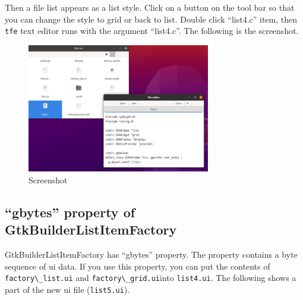 Then a file list appears as a list style. Click on a button on the tool
bar so that you can change the style to grid or back to list. Double
click ``list4.c'' item, then \passthrough{\lstinline!tfe!} text editor
runs with the argument ``list4.c''. The following is the screenshot.

\begin{figure}
\centering
\includegraphics[width=8cm,height=5.62cm]{../image/screenshot_list4.png}
\caption{Screenshot}
\end{figure}

\subsection{``gbytes'' property of
GtkBuilderListItemFactory}\label{gbytes-property-of-gtkbuilderlistitemfactory}

GtkBuilderListItemFactory has ``gbytes'' property. The property contains
a byte sequence of ui data. If you use this property, you can put the
contents of \passthrough{\lstinline!factory\_list.ui!} and
\passthrough{\lstinline!factory\_grid.ui!}into
\passthrough{\lstinline!list4.ui!}. The following shows a part of the
new ui file (\passthrough{\lstinline!list5.ui!}).

